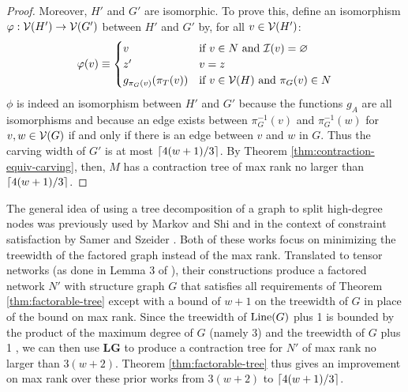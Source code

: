 \begin{proof}
Moreover, $H'$ and $G'$ are isomorphic. To prove this, define an isomorphism $\varphi: \mathcal{V}(H') \rightarrow \mathcal{V}(G')$ between $H'$ and $G'$ by, for all $v \in \mathcal{V}(H')$:
$$\varphi(v) \equiv \begin{cases}v&\text{if}~v \in N~\text{and}~\mathcal{I}(v)=\varnothing\\z'&v=z\\g_{\pi_G(v)}(\pi_T(v))&\text{if}~v \in \mathcal{V}(H)~\text{and}~\pi_G(v) \in N\end{cases}$$
$\phi$ is indeed an isomorphism between $H'$ and $G'$ because the functions $g_A$ are all isomorphisms and because an edge exists between $\pi_G^{-1}(v)$ and $\pi_G^{-1}(w)$ for $v, w \in \mathcal{V}(G)$ if and only if there is an edge between $v$ and $w$ in $G$. Thus the carving width of $G'$ is at most $\lceil4(w+1)/3\rceil$. By Theorem \ref{thm:contraction-equiv-carving}, then, $M$ has a contraction tree of max rank no larger than $\lceil4(w+1)/3\rceil$.
\end{proof}

The general idea of using a tree decomposition of a graph to split high-degree nodes was previously used by Markov and Shi \cite{MS11} and in the context of constraint satisfaction by Samer and Szeider \cite{SS10_2}. Both of these works focus on minimizing the treewidth of the factored graph instead of the max rank. Translated to tensor networks (as done in Lemma 3 of \cite{oliveira18}), their constructions produce a factored network $N'$ with structure graph $G$ that satisfies all requirements of Theorem \ref{thm:factorable-tree} except with a bound of $w+1$ on the treewidth of $G$ in place of the bound on max rank. Since the treewidth of $\text{Line}(G)$ plus 1 is bounded by the product of the maximum degree of $G$ (namely 3) and the treewidth of $G$ plus 1 \cite{MS08}, we can then use \textbf{LG} to produce a contraction tree for $N'$ of max rank no larger than $3(w+2)$. Theorem \ref{thm:factorable-tree} thus gives an improvement on max rank over these prior works from $3(w+2)$ to $\lceil4(w+1)/3\rceil$.



